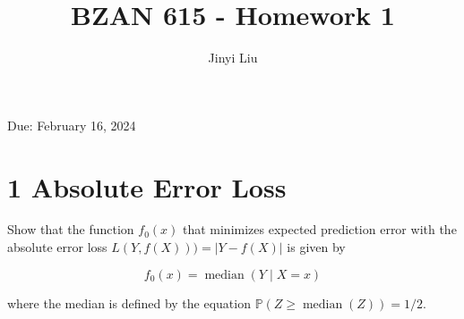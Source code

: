 \documentclass[10pt]{article}
\title{BZAN 615 - Homework 1 }
\author{Jinyi Liu}
\date{}
\begin{document}
\maketitle
Due: February 16, 2024

\section*{1 Absolute Error Loss}
Show that the function $f_{0}(x)$ that minimizes expected prediction error with the absolute error loss $L(Y, f(X)))=|Y-f(X)|$ is given by

$$
f_{0}(x)=\operatorname{median}(Y \mid X=x)
$$

where the median is defined by the equation $\mathbb{P}(Z \geq \operatorname{median}(Z))=1 / 2$.

\end{document}
